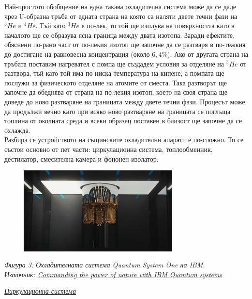     Най-простото обобщение на една такава охладителна система може да се даде чрез U-образна тръба от едната страна на която са наляти двете течни фази на $^3He$ и $^4He$. Тъй като $^3He$ е по-лек, то той
    ще изплува на повърхността като в началото ще се образува ясна граница между двата изотопа. Заради ефектите, обяснени по-рано част от по-лекия изотоп ще започне да се разтваря в по-тежкия до достигане
    на равновесна концентрация (около $6,4\%$). Ако от другата страна на тръбата поставим нагревател с помпа ще създадем условия за отделяне на $^3He$ от разтвора, тъй като той има по-ниска температура на
    кипене, а помпата ще послужи за физическото отделяне на атомите от сместа. Така разтворът ще започне да обеднява от страна на по-лекия изотоп, което на своя страна ще доведе до ново разтваряне на границата
    между двете течни фази. Процесът може да продължи вечно като при всяко ново разтваряне на границата се поглъща топлина от околната среда и всеки образец поставен в близост ще започне да се охлажда.\\
    Разбира се устройството на същинските охладителни апарати е по-сложно. То се състои основно от пет части: циркулационна система, топлообменник, дестилатор, смесителна камера и фононен изолатор. \cite{hall1966helium}\\

    \begin{figure}[H]
        \centering
        \includegraphics[width=230pt]{1.png}
    \end{figure}
    \begin{center}
        \small \textit{Фигура 3: Охладителната система Quantum System One на IBM.\\
        Източник: \href{https://www.ibm.com/quantum-computing/systems}{Commanding the power of nature with IBM Quantum systems}}
    \end{center}

    \vspace{3mm}

    \normalsize{\textit{\underline{Циркулационна система}}}\\

